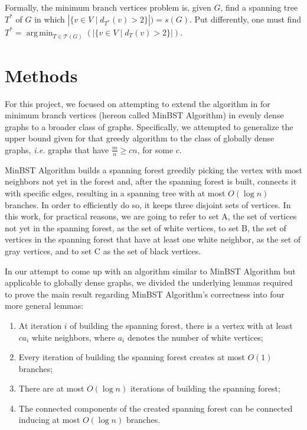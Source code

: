 \documentclass[12pt]{article}
\DeclareMathOperator*{\argmin}{arg\,min}
\begin{document}
Formally, the minimum branch vertices problem is, given $G$, find a spanning tree $T^*$ of $G$ in which $|\{v \in V \mid d_{T^*}(v) > 2 \}|) = s(G)$.
Put differently, one must find $T^* = \argmin_{T \in \mathcal{T}(G)}(|\{ v \in V \mid d_T(v) > 2\}|)$.

\section{Methods} \label{sec:methods}

For this project, we focused on attempting to extend the algorithm in \cite{salamon2010} for minimum branch vertices (hereon called MinBST Algorithm) in evenly dense graphs to a broader class of graphs.
Specifically, we attempted to generalize the upper bound given for that greedy algorithm to the class of globally dense graphs, \emph{i.e.} graphs that have $\frac{m}{n} \ge cn$, for some $c$.

MinBST Algorithm builds a spanning forest greedily picking the vertex with most neighbors not yet in the forest and, after the spanning forest is built, connects it with specific edges, resulting in a spanning tree with at most $O(\log n)$ branches.
In order to efficiently do so, it keeps three disjoint sets of vertices.
In this work, for practical reasons, we are going to refer to set A, the set of vertices not yet in the spanning forest, as the set of white vertices, to set B, the set of vertices in the spanning forest that have at least one white neighbor, as the set of gray vertices, and to set C as the set of black vertices.

In our attempt to come up with an algorithm similar to MinBST Algorithm but applicable to globally dense graphs, we divided the underlying lemmas required to prove the main result regarding MinBST Algorithm's correctness into four more general lemmas:

\begin{enumerate}
  \item At iteration $i$ of building the spanning forest, there is a vertex with at least $ca_i$ white neighbors, where $a_i$ denotes the number of white vertices;
  \item Every iteration of building the spanning forest creates at most $O(1)$ branches;
  \item There are at most $O(\log n)$ iterations of building the spanning forest;
  \item The connected components of the created spanning forest can be connected inducing at most $O(\log n)$ branches.
\end{enumerate}
\end{document}
